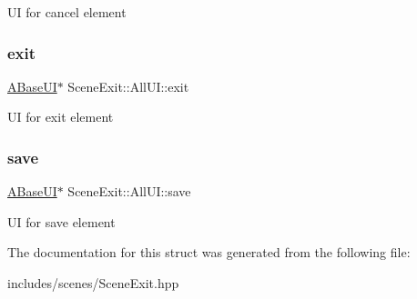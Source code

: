 UI for cancel element \mbox{\label{struct_scene_exit_1_1_all_u_i_ac32d7e8963242711eced6bdcc72a7d07}} 
\subsubsection{\texorpdfstring{exit}{exit}}
{\footnotesize\ttfamily \hyperlink{class_a_base_u_i}{A\+Base\+UI}$\ast$ Scene\+Exit\+::\+All\+U\+I\+::exit}

UI for exit element \mbox{\label{struct_scene_exit_1_1_all_u_i_abc6ec694aeb6052218b97382aae13af1}} 
\subsubsection{\texorpdfstring{save}{save}}
{\footnotesize\ttfamily \hyperlink{class_a_base_u_i}{A\+Base\+UI}$\ast$ Scene\+Exit\+::\+All\+U\+I\+::save}

UI for save element 

The documentation for this struct was generated from the following file\+:\begin{DoxyCompactItemize}
\item 
includes/scenes/Scene\+Exit.\+hpp\end{DoxyCompactItemize}
